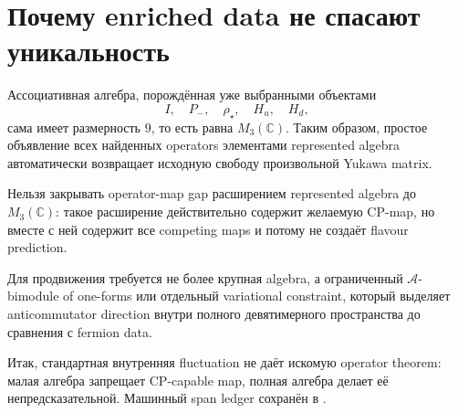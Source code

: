 \section{Почему enriched data не спасают уникальность}

Ассоциативная алгебра, порождённая уже выбранными объектами
\begin{equation}
 I,\quad P_-,\quad\rho_\star,\quad H_u,\quad H_d,
\end{equation}
сама имеет размерность \(9\), то есть равна \(M_3(\mathbb C)\). Таким
образом, простое объявление всех найденных operators элементами represented
algebra автоматически возвращает исходную свободу произвольной Yukawa
matrix.

\begin{nogocriterion}
Нельзя закрывать operator-map gap расширением represented algebra до
\(M_3(\mathbb C)\): такое расширение действительно содержит желаемую
CP-map, но вместе с ней содержит все competing maps и потому не создаёт
flavour prediction.
\end{nogocriterion}

\begin{proposition}
Для продвижения требуется не более крупная algebra, а ограниченный
\(\mathcal A\)-bimodule of one-forms или отдельный variational constraint,
который выделяет anticommutator direction внутри полного девятимерного
пространства до сравнения с fermion data.
\end{proposition}

Итак, стандартная внутренняя fluctuation не даёт искомую operator theorem:
малая алгебра запрещает CP-capable map, полная алгебра делает её
непредсказательной. Машинный span ledger сохранён в
.